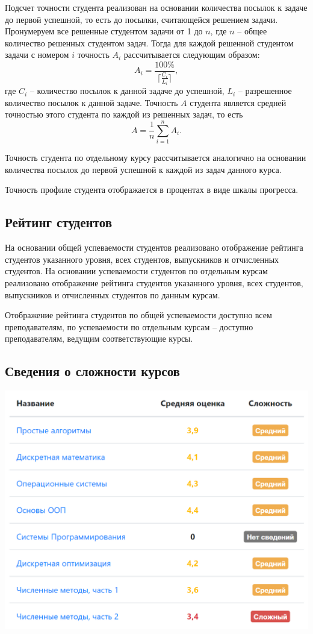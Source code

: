 \documentclass[12pt, a4paper, oneside]{article}
\begin{document}
Подсчет точности студента реализован на основании количества посылок к задаче до первой успешной, то есть до посылки, считающейся решением задачи. Пронумеруем все решенные студентом задачи от 1 до $n$, где $n$ – общее количество решенных студентом задач. Тогда для каждой решенной студентом задачи с номером $i$ точность $A_i$ рассчитывается следующим образом: 
$$A_i=\frac{100\%}{\lceil \frac{C_i}{L_i}\rceil},$$
где $C_i$ – количество посылок к данной задаче до успешной, $L_i$ – разрешенное количество посылок к данной задаче. Точность $A$ студента является средней точностью этого студента по каждой из решенных задач, то есть
$$A=\frac{1}{n}\sum_{i=1}^{n}A_i.$$

Точность студента по отдельному курсу рассчитывается аналогично на основании количества посылок до первой успешной к каждой из задач данного курса.

Точность профиле студента отображается в процентах в виде шкалы прогресса.
\subsection{Рейтинг студентов}
На основании общей успеваемости студентов реализовано отображение рейтинга студентов указанного уровня, всех студентов, выпускников и отчисленных студентов. На основании успеваемости студентов по отдельным курсам реализовано отображение рейтинга студентов указанного уровня, всех студентов, выпускников и отчисленных студентов по данным курсам.

Отображение рейтинга студентов по общей успеваемости доступно всем преподавателям, по успеваемости по отдельным курсам – доступно преподавателям, ведущим соответствующие курсы.
\subsection{Сведения о сложности курсов}
\begin{center}
    \includegraphics[scale=0.45]{course-difficulty}
\end{center}
\end{document}
